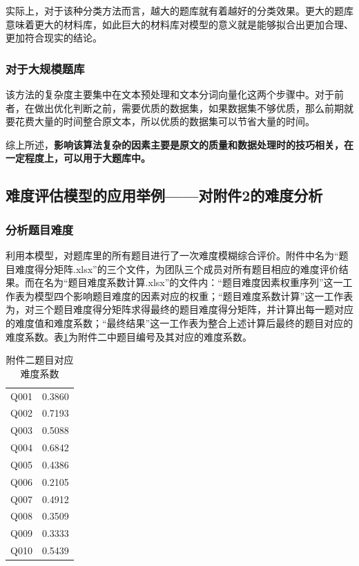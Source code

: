 实际上，对于该种分类方法而言，越大的题库就有着越好的分类效果。更大的题库意味着更大的材料库，如此巨大的材料库对模型的意义就是能够拟合出更加合理、更加符合现实的结论。


\subsubsection{对于大规模题库}

该方法的复杂度主要集中在文本预处理和文本分词向量化这两个步骤中。对于前者，在做出优化判断之前，需要优质的数据集，如果数据集不够优质，那么前期就要花费大量的时间整合原文本，所以优质的数据集可以节省大量的时间。

综上所述，\textbf{影响该算法复杂的因素主要是原文的质量和数据处理时的技巧相关，在一定程度上，可以用于大题库中。}

\subsection{难度评估模型的应用举例——对附件2的难度分析}

\subsubsection{分析题目难度}

利用本模型，对题库里的所有题目进行了一次难度模糊综合评价。附件中名为“题目难度得分矩阵.xlsx”的三个文件，为团队三个成员对所有题目相应的难度评价结果。而在名为“题目难度系数计算.xlsx”的文件内：“题目难度因素权重序列”这一工作表为模型四个影响题目难度的因素对应的权重；“题目难度系数计算”这一工作表为，对三个题目难度得分矩阵求得最终的题目难度得分矩阵，并计算出每一题对应的难度值和难度系数；“最终结果”这一工作表为整合上述计算后最终的题目对应的难度系数。表\ref{tableDiff}为附件二中题目编号及其对应的难度系数。

\begin{table}[htbp]
    \centering
    \label{tableDiff}
    \caption{附件二题目对应难度系数}
    \begin{tabular}{@{}cc@{}}
    \toprule
    \quad\quad\quad\quad{}\quad\quad\quad\quad\quad & \quad\quad\quad\quad{}\quad\quad\quad\quad\quad\\ \midrule
    Q001 & 0.3860 \\
    Q002 & 0.7193 \\
    Q003 & 0.5088 \\
    Q004 & 0.6842 \\
    Q005 & 0.4386 \\
    Q006 & 0.2105 \\
    Q007 & 0.4912 \\
    Q008 & 0.3509 \\
    Q009 & 0.3333 \\
    Q010 & 0.5439 \\ \bottomrule
    \end{tabular}
\end{table}

